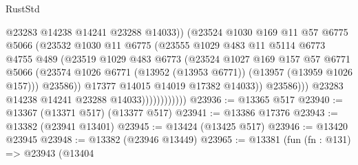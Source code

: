 \begin{lexlean}{RustStd}
\begin{coremodule}
                                    @23283
                                    @14238
                                    @14241
                                    @23288
                                    @14033))
                                (@23524
                                  @1030
                                  @169
                                  @11
                                  @57
                                  @6775
                                  @5066
                                  (@23532
                                    @1030
                                    @11
                                    @6775
                                    (@23555
                                      @1029
                                      @483
                                      @11
                                      @5114
                                      @6773
                                      @4755
                                      @489
                                      (@23519
                                        @1029
                                        @483
                                        @6773
                                        (@23524
                                          @1027
                                          @169
                                          @157
                                          @57
                                          @6771
                                          @5066
                                          (@23574
                                            @1026
                                            @6771
                                            (@13952 (@13953 @6771))
                                            (@13957 (@13959 @1026 @157)))
                                          @23586))
                                      @17377
                                      @14015
                                      @14019
                                      @17382
                                      @14033))
                                  @23586)))
                            @23283
                            @14238
                            @14241
                            @23288
                            @14033))))))))))))
@23936 := @13365 @517
@23940 := @13367 (@13371 @517) (@13377 @517)
@23941 := @13386 @17376
@23943 := @13382 (@23941 @13401)
@23945 := @13424 (@13425 @517)
@23946 := @13420 @23945
@23948 := @13382 (@23946 @13449)
@23965 := @13381
    (fun (fn : @131) =>
    @23943
      (@13404

\end{coremodule}
\end{lexlean}
